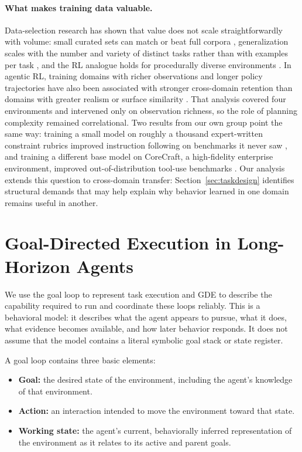 \documentclass{article}
\begin{document}
\paragraph{What makes training data valuable.}
Data-selection research has shown that value does not scale straightforwardly with volume: small curated sets can match or beat full corpora \citep{zhou2023lima, xia2024less, liu2024deita}, generalization scales with the number and variety of distinct tasks rather than with examples per task \citep{wei2021flan, chung2022scaling, zhang2024instruction}, and the RL analogue holds for procedurally diverse environments \citep{cobbe2020procgen}. In agentic RL, training domains with richer observations and longer policy trajectories have also been associated with stronger cross-domain retention than domains with greater realism or surface similarity \citep{liu2026generalizationtax}. That analysis covered four environments and intervened only on observation richness, so the role of planning complexity remained correlational. Two results from our own group point the same way: training a small model on roughly a thousand expert-written constraint rubrics improved instruction following on benchmarks it never saw \citep{surge2026complexif}, and training a different base model on CoreCraft, a high-fidelity enterprise environment, improved out-of-distribution tool-use benchmarks \citep{mehta2026corecraft}. Our analysis extends this question to cross-domain transfer: Section~\ref{sec:taskdesign} identifies structural demands that may help explain why behavior learned in one domain remains useful in another.

\section{Goal-Directed Execution in Long-Horizon Agents}
\label{sec:taskmodel}

We use the goal loop to represent task execution and GDE to describe the capability required to run and coordinate these loops reliably. This is a behavioral model: it describes what the agent appears to pursue, what it does, what evidence becomes available, and how later behavior responds. It does not assume that the model contains a literal symbolic goal stack or state register.

A goal loop contains three basic elements:

\begin{itemize}
  \item \textbf{Goal:} the desired state of the environment, including the agent's knowledge of that environment.
  \item \textbf{Action:} an interaction intended to move the environment toward that state.
  \item \textbf{Working state:} the agent's current, behaviorally inferred representation of the environment as it relates to its active and parent goals.
\end{itemize}
\end{document}
